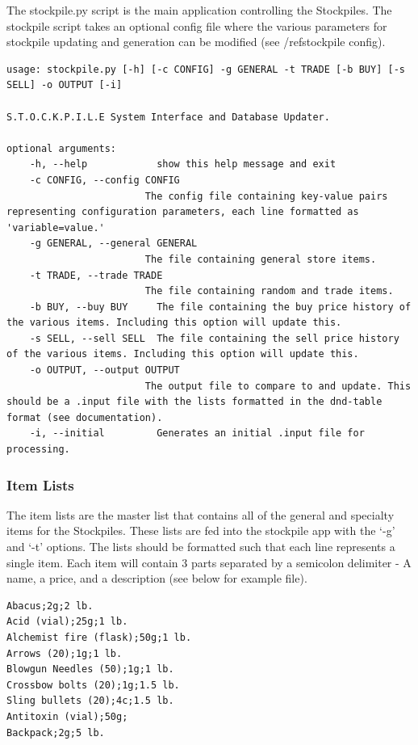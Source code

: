 The stockpile.py script is the main application controlling the Stockpiles. The stockpile script takes an optional config file where the various parameters for stockpile updating and generation can be modified (see /ref{stockpile config}).

\begin{lstlisting}
usage: stockpile.py [-h] [-c CONFIG] -g GENERAL -t TRADE [-b BUY] [-s SELL] -o OUTPUT [-i]

S.T.O.C.K.P.I.L.E System Interface and Database Updater.

optional arguments:
	-h, --help            show this help message and exit
	-c CONFIG, --config CONFIG
	                    The config file containing key-value pairs representing configuration parameters, each line formatted as 'variable=value.'
	-g GENERAL, --general GENERAL
	                    The file containing general store items.
	-t TRADE, --trade TRADE
	                    The file containing random and trade items.
	-b BUY, --buy BUY     The file containing the buy price history of the various items. Including this option will update this.
	-s SELL, --sell SELL  The file containing the sell price history of the various items. Including this option will update this.
	-o OUTPUT, --output OUTPUT
	                    The output file to compare to and update. This should be a .input file with the lists formatted in the dnd-table format (see documentation).
	-i, --initial         Generates an initial .input file for processing.
\end{lstlisting}

\subsubsection{Item Lists}

The item lists are the master list that contains all of the general and specialty items for the Stockpiles. These lists are fed into the stockpile app with the `-g' and `-t' options. The lists should be formatted such that each line represents a single item. Each item will contain 3 parts separated by a semicolon delimiter - A name, a price, and a description (see below for example file). 

\begin{lstlisting}
Abacus;2g;2 lb.
Acid (vial);25g;1 lb.
Alchemist fire (flask);50g;1 lb.
Arrows (20);1g;1 lb.
Blowgun Needles (50);1g;1 lb.
Crossbow bolts (20);1g;1.5 lb.
Sling bullets (20);4c;1.5 lb.
Antitoxin (vial);50g;
Backpack;2g;5 lb.
\end{lstlisting}

